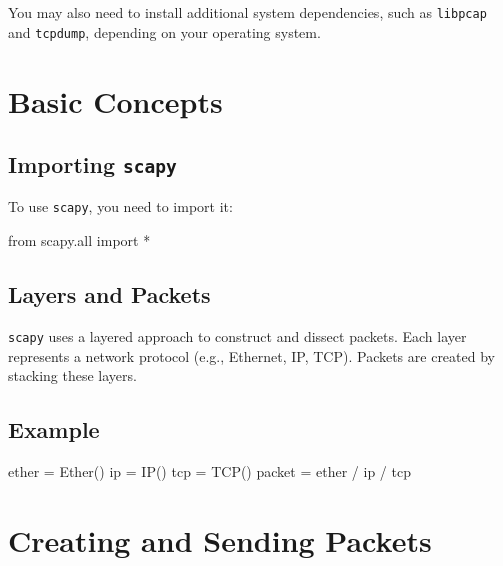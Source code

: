 \documentclass[
  letterpaper,
  DIV=11,
  numbers=noendperiod]{scrreprt}
\newenvironment{Shaded}{\begin{snugshade}}{\end{snugshade}}
\newcommand{\BuiltInTok}[1]{\textcolor[rgb]{0.00,0.23,0.31}{#1}}
\newcommand{\ImportTok}[1]{\textcolor[rgb]{0.00,0.46,0.62}{#1}}
\newcommand{\NormalTok}[1]{\textcolor[rgb]{0.00,0.23,0.31}{#1}}
\newcommand{\OperatorTok}[1]{\textcolor[rgb]{0.37,0.37,0.37}{#1}}
\begin{document}
You may also need to install additional system dependencies, such as
\texttt{libpcap} and \texttt{tcpdump}, depending on your operating
system.

\section{Basic Concepts}\label{basic-concepts-1}

\subsection{\texorpdfstring{Importing
\texttt{scapy}}{Importing scapy}}\label{importing-scapy}

To use \texttt{scapy}, you need to import it:

\begin{Shaded}
\begin{Highlighting}[]
\ImportTok{from}\NormalTok{ scapy.}\BuiltInTok{all} \ImportTok{import} \OperatorTok{*}
\end{Highlighting}
\end{Shaded}

\subsection{Layers and Packets}\label{layers-and-packets}

\texttt{scapy} uses a layered approach to construct and dissect packets.
Each layer represents a network protocol (e.g., Ethernet, IP, TCP).
Packets are created by stacking these layers.

\subsection{Example}\label{example-59}

\begin{Shaded}
\begin{Highlighting}[]
\NormalTok{ether }\OperatorTok{=}\NormalTok{ Ether()}
\NormalTok{ip }\OperatorTok{=}\NormalTok{ IP()}
\NormalTok{tcp }\OperatorTok{=}\NormalTok{ TCP()}
\NormalTok{packet }\OperatorTok{=}\NormalTok{ ether }\OperatorTok{/}\NormalTok{ ip }\OperatorTok{/}\NormalTok{ tcp}
\end{Highlighting}
\end{Shaded}

\section{Creating and Sending
Packets}\label{creating-and-sending-packets}
\end{document}
